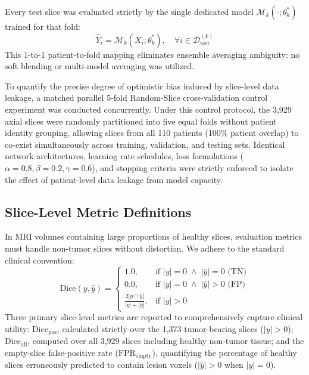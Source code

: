 \documentclass[preprint,12pt,authoryear]{elsarticle}
\begin{document}
Every test slice was evaluated strictly by the single dedicated model $\mathcal{M}_k(\cdot; \theta_k^*)$ trained for that fold:
\begin{equation}
\hat{Y}_i = \mathcal{M}_k(X_i; \theta_k^*), \quad \forall i \in \mathcal{D}_{\text{test}}^{(k)}
\end{equation}
This 1-to-1 patient-to-fold mapping eliminates ensemble averaging ambiguity: no soft blending or multi-model averaging was utilized.

To quantify the precise degree of optimistic bias induced by slice-level data leakage, a matched parallel 5-fold Random-Slice cross-validation control experiment was conducted concurrently. Under this control protocol, the 3,929 axial slices were randomly partitioned into five equal folds without patient identity grouping, allowing slices from all 110 patients (100\% patient overlap) to co-exist simultaneously across training, validation, and testing sets. Identical network architectures, learning rate schedules, loss formulations ($\alpha=0.8, \beta=0.2, \gamma=0.6$), and stopping criteria were strictly enforced to isolate the effect of patient-level data leakage from model capacity.

\subsection{Slice-Level Metric Definitions}
In MRI volumes containing large proportions of healthy slices, evaluation metrics must handle non-tumor slices without distortion. We adhere to the standard clinical convention:
\begin{equation}
\text{Dice}(y, \hat{y}) = \begin{cases}
1.0, & \text{if } |y| = 0 \;\land\; |\hat{y}| = 0 \text{ (TN)} \\
0.0, & \text{if } |y| = 0 \;\land\; |\hat{y}| > 0 \text{ (FP)} \\
\frac{2|y \cap \hat{y}|}{|y| + |\hat{y}|}, & \text{if } |y| > 0
\end{cases}
\end{equation}
Three primary slice-level metrics are reported to comprehensively capture clinical utility: $\text{Dice}_{\text{pos}}$, calculated strictly over the 1,373 tumor-bearing slices ($|y| > 0$); $\text{Dice}_{\text{all}}$, computed over all 3,929 slices including healthy non-tumor tissue; and the empty-slice false-positive rate ($\text{FPR}_{\text{empty}}$), quantifying the percentage of healthy slices erroneously predicted to contain lesion voxels ($|\hat{y}| > 0$ when $|y| = 0$).
\end{document}
